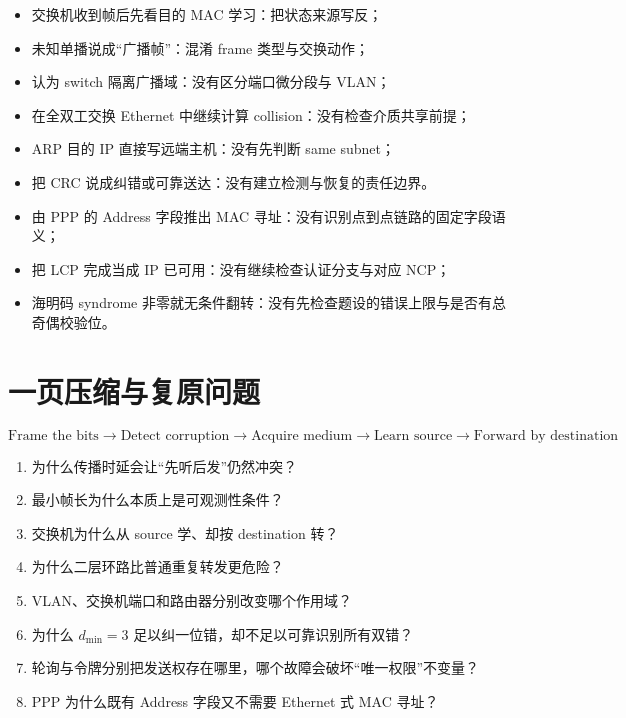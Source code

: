 \documentclass[UTF8,fontset=none,11pt,a4paper]{ctexart}
\providecommand{\tightlist}{\setlength{\itemsep}{0pt}\setlength{\parskip}{0pt}}
\begin{document}
\begin{itemize}
\tightlist
\item
  交换机收到帧后先看目的 MAC 学习：把状态来源写反；
\item
  未知单播说成``广播帧''：混淆 frame 类型与交换动作；
\item
  认为 switch 隔离广播域：没有区分端口微分段与 VLAN；
\item
  在全双工交换 Ethernet 中继续计算 collision：没有检查介质共享前提；
\item
  ARP 目的 IP 直接写远端主机：没有先判断 same subnet；
\item
  把 CRC 说成纠错或可靠送达：没有建立检测与恢复的责任边界。
\item
  由 PPP 的 Address 字段推出 MAC 寻址：没有识别点到点链路的固定字段语义；
\item
  把 LCP 完成当成 IP 已可用：没有继续检查认证分支与对应 NCP；
\item
  海明码 syndrome 非零就无条件翻转：没有先检查题设的错误上限与是否有总奇偶校验位。
\end{itemize}

\section{一页压缩与复原问题}\label{14-ux4e00ux9875ux538bux7f29ux4e0eux590dux539fux95eeux9898}

\[
\boxed{
\text{Frame the bits}
\to \text{Detect corruption}
\to \text{Acquire medium}
\to \text{Learn source}
\to \text{Forward by destination}
}
\]

\begin{enumerate}
\def\labelenumi{\arabic{enumi}.}
\tightlist
\item
  为什么传播时延会让``先听后发''仍然冲突？
\item
  最小帧长为什么本质上是可观测性条件？
\item
  交换机为什么从 source 学、却按 destination 转？
\item
  为什么二层环路比普通重复转发更危险？
\item
  VLAN、交换机端口和路由器分别改变哪个作用域？
\item
  为什么 $d_{\min}=3$ 足以纠一位错，却不足以可靠识别所有双错？
\item
  轮询与令牌分别把发送权存在哪里，哪个故障会破坏“唯一权限”不变量？
\item
  PPP 为什么既有 Address 字段又不需要 Ethernet 式 MAC 寻址？
\end{enumerate}
\end{document}
